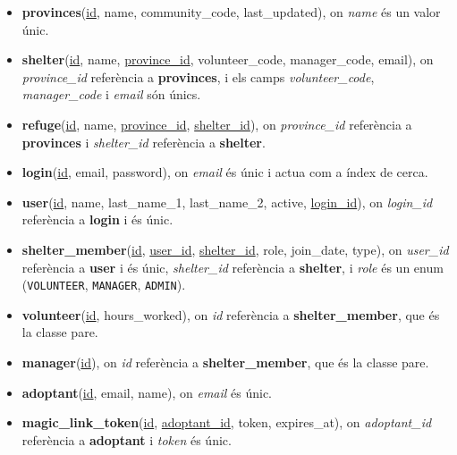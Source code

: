 \documentclass[11pt,a4paper]{report}
\begin{document}
\begin{itemize}
    \item \textbf{provinces}(\underline{id}, name, community\_code, last\_updated), on \textit{name} és un valor únic.
    
    \item \textbf{shelter}(\underline{id}, name, \underline{province\_id}, volunteer\_code, manager\_code, email), on \textit{province\_id} referència a \textbf{provinces}, i els camps \textit{volunteer\_code}, \textit{manager\_code} i \textit{email} són únics.
    
    \item \textbf{refuge}(\underline{id}, name, \underline{province\_id}, \underline{shelter\_id}), on \textit{province\_id} referència a \textbf{provinces} i \textit{shelter\_id} referència a \textbf{shelter}.
    
    \item \textbf{login}(\underline{id}, email, password), on \textit{email} és únic i actua com a índex de cerca.
    
    \item \textbf{user}(\underline{id}, name, last\_name\_1, last\_name\_2, active, \underline{login\_id}), on \textit{login\_id} referència a \textbf{login} i és únic.
    
    \item \textbf{shelter\_member}(\underline{id}, \underline{user\_id}, \underline{shelter\_id}, role, join\_date, type), on \textit{user\_id} referència a \textbf{user} i és únic, \textit{shelter\_id} referència a \textbf{shelter}, i \textit{role} és un enum (\texttt{VOLUNTEER}, \texttt{MANAGER}, \texttt{ADMIN}).
    
    \item \textbf{volunteer}(\underline{id}, hours\_worked), on \textit{id} referència a \textbf{shelter\_member}, que és la classe pare.
    
    \item \textbf{manager}(\underline{id}), on \textit{id} referència a \textbf{shelter\_member}, que és la classe pare.
    
    \item \textbf{adoptant}(\underline{id}, email, name), on \textit{email} és únic.
    
    \item \textbf{magic\_link\_token}(\underline{id}, \underline{adoptant\_id}, token, expires\_at), on \textit{adoptant\_id} referència a \textbf{adoptant} i \textit{token} és únic.
    

\end{itemize}
\end{document}
